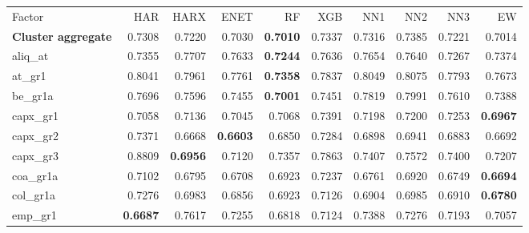 \begin{longtable}{>{\raggedright\arraybackslash}p{2.6cm}rrrrrrrrr}
\hline
\multicolumn{10}{@{}l}{\textit{Panel C. Investment}} \\
\hline
Factor & HAR & HARX & ENET & RF & XGB & NN1 & NN2 & NN3 & EW \\
\hline
\textbf{Cluster aggregate} & 0.7308 & \cellcolor{blue!10}0.7220 & \cellcolor{blue!10}0.7030 & \textbf{\cellcolor{blue!10}0.7010} & 0.7337 & 0.7316 & 0.7385 & \cellcolor{blue!10}0.7221 & \cellcolor{blue!10}0.7014 \\
aliq\_at & 0.7355 & 0.7707 & 0.7633 & \textbf{\cellcolor{blue!10}0.7244} & 0.7636 & 0.7654 & 0.7640 & \cellcolor{blue!10}0.7267 & 0.7374 \\
at\_gr1 & 0.8041 & \cellcolor{blue!10}0.7961 & \cellcolor{blue!10}0.7761 & \textbf{\cellcolor{blue!10}0.7358} & \cellcolor{blue!10}0.7837 & 0.8049 & 0.8075 & \cellcolor{blue!10}0.7793 & \cellcolor{blue!10}0.7673 \\
be\_gr1a & 0.7696 & \cellcolor{blue!10}0.7596 & \cellcolor{blue!10}0.7455 & \textbf{\cellcolor{blue!10}0.7001} & \cellcolor{blue!10}0.7451 & 0.7819 & 0.7991 & \cellcolor{blue!10}0.7610 & \cellcolor{blue!10}0.7388 \\
capx\_gr1 & 0.7058 & 0.7136 & \cellcolor{blue!10}0.7045 & 0.7068 & 0.7391 & 0.7198 & 0.7200 & 0.7253 & \textbf{\cellcolor{blue!10}0.6967} \\
capx\_gr2 & 0.7371 & \cellcolor{blue!10}0.6668 & \textbf{\cellcolor{blue!10}0.6603} & \cellcolor{blue!10}0.6850 & \cellcolor{blue!10}0.7284 & \cellcolor{blue!10}0.6898 & \cellcolor{blue!10}0.6941 & \cellcolor{blue!10}0.6883 & \cellcolor{blue!10}0.6692 \\
capx\_gr3 & 0.8809 & \textbf{\cellcolor{blue!10}0.6956} & \cellcolor{blue!10}0.7120 & \cellcolor{blue!10}0.7357 & \cellcolor{blue!10}0.7863 & \cellcolor{blue!10}0.7407 & \cellcolor{blue!10}0.7572 & \cellcolor{blue!10}0.7400 & \cellcolor{blue!10}0.7207 \\
coa\_gr1a & 0.7102 & \cellcolor{blue!10}0.6795 & \cellcolor{blue!10}0.6708 & \cellcolor{blue!10}0.6923 & 0.7237 & \cellcolor{blue!10}0.6761 & \cellcolor{blue!10}0.6920 & \cellcolor{blue!10}0.6749 & \textbf{\cellcolor{blue!10}0.6694} \\
col\_gr1a & 0.7276 & \cellcolor{blue!10}0.6983 & \cellcolor{blue!10}0.6856 & \cellcolor{blue!10}0.6923 & \cellcolor{blue!10}0.7126 & \cellcolor{blue!10}0.6904 & \cellcolor{blue!10}0.6985 & \cellcolor{blue!10}0.6910 & \textbf{\cellcolor{blue!10}0.6780} \\
emp\_gr1 & \textbf{0.6687} & 0.7617 & 0.7255 & 0.6818 & 0.7124 & 0.7388 & 0.7276 & 0.7193 & 0.7057 \\

\end{longtable}
